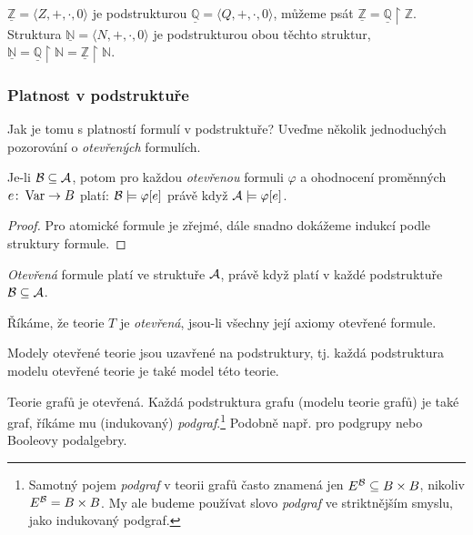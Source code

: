 \begin{example}
    $\underline{\mathbb Z}=\langle Z,+,\cdot,0\rangle$ je podstrukturou $\underline{\mathbb Q}=\langle Q,+,\cdot,0\rangle$, můžeme psát $\underline{\mathbb Z}=\underline{\mathbb Q}\restriction\mathbb Z$. Struktura $\underline{\mathbb N}=\langle N,+,\cdot,0\rangle$ je podstrukturou obou těchto struktur, $\underline{\mathbb N}=\underline{\mathbb Q}\restriction\mathbb N=\underline{\mathbb Z}\restriction\mathbb N$.
\end{example}

\subsubsection{Platnost v podstruktuře}

Jak je tomu s platností formulí v podstruktuře? Uveďme několik jednoduchých pozorování o \emph{otevřených} formulích.

\begin{observation}
    Je-li $\mathcal{B}\subseteq\mathcal{A}$, potom pro každou \emph{otevřenou} formuli $\varphi$ a ohodnocení proměnných $e\colon\operatorname{Var}\to B$ platí: $\mathcal{B}\models\varphi[e]$ právě když $\mathcal{A}\models\varphi[e]$.
\end{observation}
\begin{proof}
    Pro atomické formule je zřejmé, dále snadno dokážeme indukcí podle struktury formule.
\end{proof}

\begin{corollary}
    \emph{Otevřená} formule platí ve struktuře $\mathcal{A}$, právě když platí v každé podstruktuře $\mathcal{B}\subseteq\mathcal{A}$.
\end{corollary}

Říkáme, že teorie $T$ je \emph{otevřená}, jsou-li všechny její axiomy otevřené formule.

\begin{corollary}
    Modely otevřené teorie jsou uzavřené na podstruktury, tj. každá podstruktura modelu otevřené teorie je také model této teorie.
\end{corollary}

\begin{example}
    Teorie grafů je otevřená. Každá podstruktura grafu (modelu teorie grafů) je také graf, říkáme mu (indukovaný) \emph{podgraf}.\footnote{Samotný pojem \emph{podgraf} v teorii grafů často znamená jen $E^{\mathcal{B}}\subseteq B\times B$, nikoliv $E^{\mathcal{B}}=B\times B$. My ale budeme používat slovo \emph{podgraf} ve striktnějším smyslu, jako indukovaný podgraf.} Podobně např. pro podgrupy nebo Booleovy podalgebry.
\end{example}

